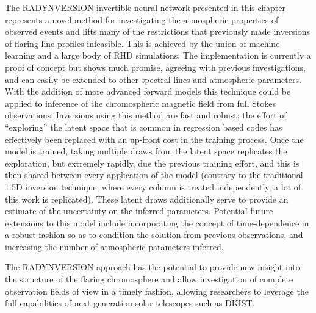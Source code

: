 The RADYNVERSION invertible neural network presented in this chapter represents a novel method for investigating the atmospheric properties of observed events and lifts many of the restrictions that previously made inversions of flaring line profiles infeasible.
This is achieved by the union of machine learning and a large body of RHD simulations.
The implementation is currently a proof of concept but shows much promise, agreeing with previous investigations, and can easily be extended to other spectral lines and atmospheric parameters.
With the addition of more advanced forward models this technique could be applied to inference of the chromospheric magnetic field from full Stokes observations.
Inversions using this method are fast and robust; the effort of ``exploring'' the latent space that is common in regression based codes has effectively been replaced with an up-front cost in the training process.
Once the model is trained, taking multiple draws from the latent space replicates the exploration, but extremely rapidly, due the previous training effort, and this is then shared between every application of the model (contrary to the traditional 1.5D inversion technique, where every column is treated independently, a lot of this work is replicated).
These latent draws additionally serve to provide an estimate of the uncertainty on the inferred parameters.
Potential future extensions to this model include incorporating the concept of time-dependence in a robust fashion so as to condition the solution from previous observations, and increasing the number of atmospheric parameters inferred.

The RADYNVERSION approach has the potential to provide new insight into the structure of the flaring chromosphere and allow investigation of complete observation fields of view in a timely fashion, allowing researchers to leverage the full capabilities of next-generation solar telescopes such as DKIST.

